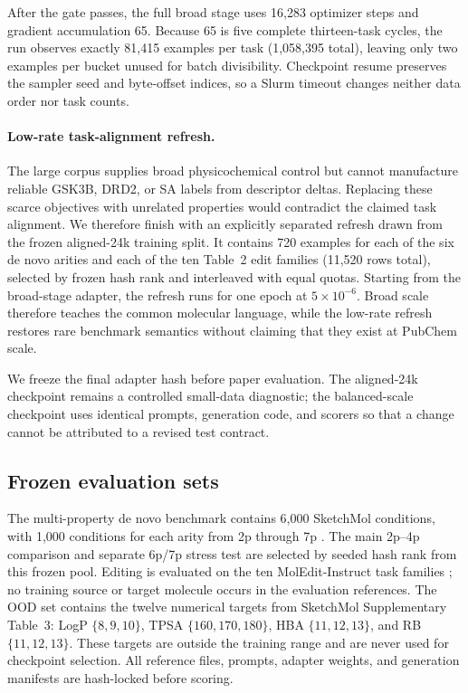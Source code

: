 After the gate passes, the full broad stage uses 16,283 optimizer steps and
gradient accumulation 65. Because 65 is five complete thirteen-task cycles,
the run observes exactly 81,415 examples per task (1,058,395 total), leaving
only two examples per bucket unused for batch divisibility. Checkpoint resume
preserves the sampler seed and byte-offset indices, so a Slurm timeout changes
neither data order nor task counts.

\paragraph{Low-rate task-alignment refresh.}
The large corpus supplies broad physicochemical control but cannot manufacture
reliable GSK3B, DRD2, or SA labels from descriptor deltas. Replacing these
scarce objectives with unrelated properties would contradict the claimed task
alignment. We therefore finish with an explicitly separated refresh drawn from
the frozen aligned-24k training split. It contains 720 examples for each of the
six de novo arities and each of the ten Table~2 edit families (11,520 rows
total), selected by frozen hash rank and interleaved with equal quotas. Starting
from the broad-stage adapter, the refresh runs for one epoch at
$5\times10^{-6}$. Broad scale therefore teaches the common molecular language,
while the low-rate refresh restores rare benchmark semantics without claiming
that they exist at PubChem scale.

We freeze the final adapter hash before paper evaluation. The aligned-24k
checkpoint remains a controlled small-data diagnostic; the balanced-scale
checkpoint uses identical prompts, generation code, and scorers so that a
change cannot be attributed to a revised test contract.

\subsection{Frozen evaluation sets}
The multi-property de novo benchmark contains 6,000 SketchMol conditions, with
1,000 conditions for each arity from 2p through 7p
\citep{wang2025sketchmol}. The main 2p--4p comparison and separate 6p/7p stress
test are selected by seeded hash rank from this frozen pool. Editing is
evaluated on the ten MolEdit-Instruct task families
\citep{zhuang2026moleditrl}; no training source or target molecule occurs in
the evaluation references. The OOD set contains the twelve numerical targets
from SketchMol Supplementary Table~3: LogP $\{8,9,10\}$, TPSA
$\{160,170,180\}$, HBA $\{11,12,13\}$, and RB $\{11,12,13\}$. These targets
are outside the training range and are never used for checkpoint selection.
All reference files, prompts, adapter weights, and generation manifests are
hash-locked before scoring.

